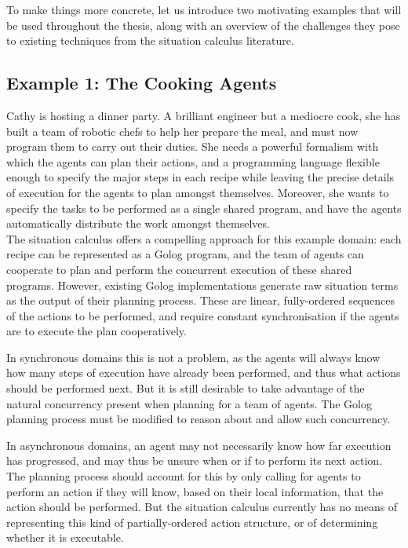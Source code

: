To make things more concrete, let us introduce two motivating examples
that will be used throughout the thesis, along with an overview of
the challenges they pose to existing techniques from the situation
calculus literature.


\subsection*{Example 1: The Cooking Agents}

Cathy is hosting a dinner party. A brilliant engineer but a mediocre
cook, she has built a team of robotic chefs to help her prepare the
meal, and must now program them to carry out their duties. She needs
a powerful formalism with which the agents can plan their actions,
and a programming language flexible enough to specify the major steps
in each recipe while leaving the precise details of execution for
the agents to plan amongst themselves. Moreover, she wants to specify
the tasks to be performed as a single shared program, and have the
agents automatically distribute the work amongst themselves.\\


The situation calculus offers a compelling approach for this example
domain: each recipe can be represented as a Golog program, and the
team of agents can cooperate to plan and perform the concurrent execution
of these shared programs. However, existing Golog implementations
generate raw situation terms as the output of their planning process.
These are linear, fully-ordered sequences of the actions to be performed,
and require constant synchronisation if the agents are to execute
the plan cooperatively.

In synchronous domains this is not a problem, as the agents will always
know how many steps of execution have already been performed, and
thus what actions should be performed next. But it is still desirable
to take advantage of the natural concurrency present when planning
for a team of agents. The Golog planning process must be modified
to reason about and allow such concurrency.

In asynchronous domains, an agent may not necessarily know how far
execution has progressed, and may thus be unsure when or if to perform
its next action. The planning process should account for this by only
calling for agents to perform an action if they will know, based on
their local information, that the action should be performed. But
the situation calculus currently has no means of representing this
kind of partially-ordered action structure, or of determining whether
it is executable.

